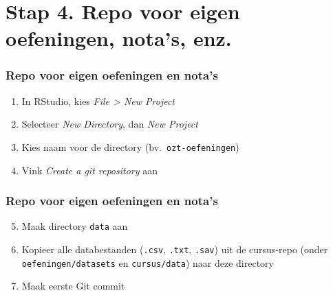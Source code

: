\documentclass[aspectratio=169]{beamer}
\begin{document}
\section{Stap 4. Repo voor eigen oefeningen, nota's, enz.}

\begin{frame}
  \frametitle{Repo voor eigen oefeningen en nota's}

  \begin{enumerate}
    \item In RStudio, kies \emph{File > New Project}
    \item Selecteer \emph{New Directory}, dan \emph{New Project}
    \item Kies naam voor de directory (bv.~\texttt{ozt-oefeningen})
    \item Vink \emph{Create a git repository} aan
  \end{enumerate}

\end{frame}

\begin{frame}
  \frametitle{Repo voor eigen oefeningen en nota's}

  \begin{enumerate}
    \setcounter{enumi}{4}
    \item Maak directory \texttt{data} aan
    \item Kopieer alle databestanden (\texttt{.csv}, \texttt{.txt}, \texttt{.sav}) uit de cursus-repo (onder \texttt{oefeningen/datasets} en \texttt{cursus/data}) naar deze directory
    \item Maak eerste Git commit
  \end{enumerate}

\end{frame}
\end{document}
